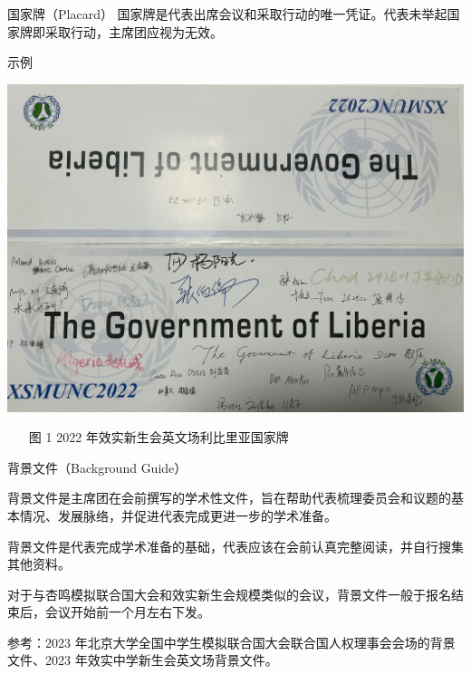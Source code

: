 \documentclass{beamer}
\begin{document}
\begin{frame}{国家牌（Placard）}
国家牌是代表出席会议和采取行动的唯一凭证。代表未举起国家牌即采取行动，主席团应视为无效。

\end{frame}

\begin{frame}{示例}

    \begin{center}\includegraphics[scale=0.08, angle = 90]{2.png}\end{center}\begin{tiny}\begin{itemize}\item[图 1] 2022 年效实新生会英文场利比里亚国家牌\end{itemize}\end{tiny}

\end{frame}

\begin{frame}{背景文件（Background Guide）}
    
背景文件是主席团在会前撰写的学术性文件，旨在帮助代表梳理委员会和议题的基本情况、发展脉络，并促进代表完成更进一步的学术准备。

背景文件是代表完成学术准备的基础，代表应该在会前认真完整阅读，并自行搜集其他资料。

对于与杏鸣模拟联合国大会和效实新生会规模类似的会议，背景文件一般于报名结束后，会议开始前一个月左右下发。

参考：2023 年北京大学全国中学生模拟联合国大会联合国人权理事会会场的背景文件、2023 年效实中学新生会英文场背景文件。

\end{frame}
\end{document}
